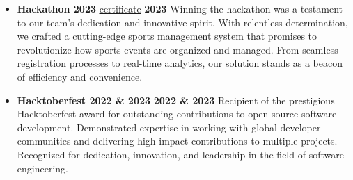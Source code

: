 \documentclass[letterpaper, 8pt]{article}
\newcommand{\secStartSpace}{\vspace{3pt}}
\newcommand{\secEndSpace}{\vspace{4pt}}
\begin{document}
\begin{addmargin}[1em]{1em}
	\begin{itemize}[itemsep=-2.25pt]
		\item \textbf{Hackathon 2023} 
  \href{https://sukhlotey.github.io/imSukhpreet/Images/hackathon.pdf}{\underline{certificate}} \hfill \textbf{2023}
  \newline
    \secStartSpace
  Winning the hackathon was a testament to our team's dedication and innovative spirit. With relentless determination, we crafted a cutting-edge sports management system that promises to revolutionize how sports events are organized and managed. From seamless registration processes to real-time analytics, our solution stands as a beacon of efficiency and convenience.
  \secEndSpace
  
		\item \textbf {Hacktoberfest 2022 \& 2023} \hfill  \textbf{2022 \& 2023}
\newline
\secStartSpace
Recipient of the prestigious Hacktoberfest award for outstanding contributions to open source software development. Demonstrated expertise in working with global developer communities and delivering high impact contributions to multiple projects. Recognized for dedication, innovation, and leadership in the field of software engineering.
\secEndSpace
  
\end{itemize}
\end{addmargin}




\end{document}
